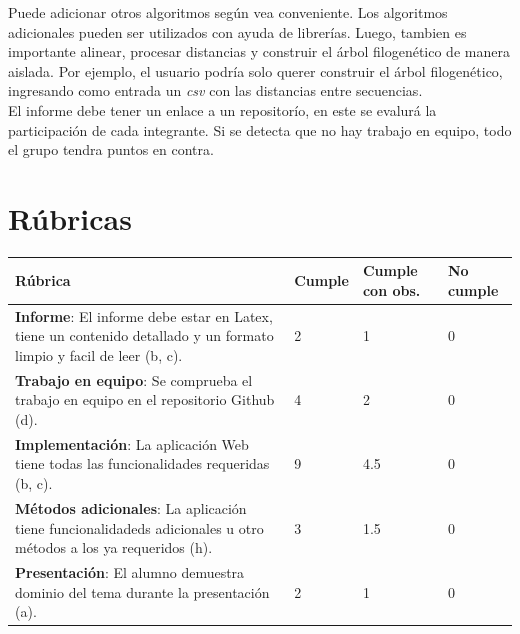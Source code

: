 \documentclass{article}
\begin{document}
Puede adicionar otros algoritmos según vea conveniente. Los algoritmos adicionales pueden ser utilizados con ayuda de librerías. Luego, tambien es importante alinear, procesar distancias y construir el árbol filogenético de manera aislada. Por ejemplo, el usuario podría solo querer construir el árbol filogenético, ingresando como entrada un \textit{csv} con las distancias entre secuencias.\\

El informe debe tener un enlace a un repositorío, en este se evalurá la participación de cada integrante. Si se detecta que no hay trabajo en equipo, todo el grupo tendra puntos en contra.

\section{Rúbricas}

\begin{table}[H]
	\begin{tabular}{|p{6cm}|x{2.5cm}|x{3cm}|x{2.5cm}|}
		\hline 
		\textbf{Rúbrica} & \textbf{Cumple}  & \textbf{Cumple con obs.}  & \textbf{No cumple} \\
		\hline 
		\textbf{Informe}: El informe debe estar en Latex, tiene un contenido detallado y un formato limpio y facil de leer (b, c).   & 2 & 1 & 0   \\
		\hline 
		\textbf{Trabajo en equipo}: Se comprueba el trabajo en equipo en el repositorio Github (d).  & 4 & 2 & 0   \\
		\hline 
		\textbf{Implementación}: La aplicación Web tiene todas las funcionalidades requeridas (b, c).  & 9 & 4.5 & 0   \\		\hline 	
		\textbf{Métodos adicionales}: La aplicación tiene funcionalidadeds adicionales u otro métodos a los ya requeridos (h).  & 3 & 1.5 & 0   \\		\hline 	
		\textbf{Presentación}: El alumno demuestra dominio del tema durante la presentación (a).  & 2 & 1 & 0   \\		\hline 		
	\end{tabular}
\end{table}
	
	

%
%
%	
	
\end{document}
